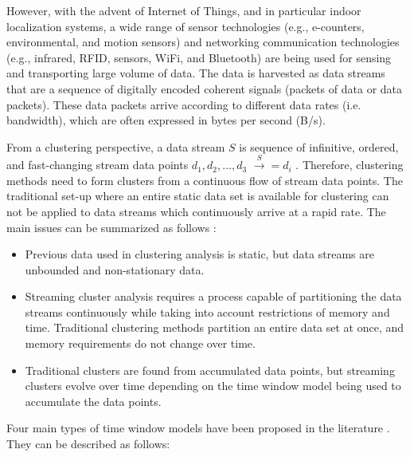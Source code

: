 However, with the advent of Internet of Things, and in particular indoor localization systems, a wide range of sensor technologies (e.g., e-counters, environmental, and motion sensors) and networking communication technologies (e.g., infrared, RFID, sensors, WiFi, and Bluetooth) are being used for sensing and transporting large volume of data. The data is harvested as data streams that are a sequence of digitally encoded coherent signals (packets of data or data packets). These data packets arrive according to different data rates (i.e. bandwidth), which are often expressed in bytes per second (B/s).

From a clustering perspective, a data stream $S$ is sequence of infinitive, ordered, and fast-changing stream data points $d_1, d_2, ..., d_3 $ $\xrightarrow S = {d_i}$ \cite{han2011data}. Therefore, clustering methods need to form clusters from a continuous flow of stream data points. The traditional set-up where an entire static data set is available for clustering can not be applied to data streams which continuously arrive at a rapid rate. The main issues can be summarized as follows \cite{toshniwal2013clustering}:

\begin{itemize}
    \item Previous data used in clustering analysis is static, but data streams are unbounded and non-stationary data.
    \item Streaming cluster analysis requires a process capable of partitioning the data streams continuously while taking into account restrictions of memory and time. Traditional clustering methods partition an entire data set at once, and memory requirements do not change over time. 
    \item Traditional clusters are found from accumulated data points, but streaming clusters evolve over time depending on the time window model being used to accumulate the data points.
\end{itemize}

Four main types of time window models have been proposed in the literature \cite{nguyen2015survey, mansalis2018evaluation}. They can be described as follows:

